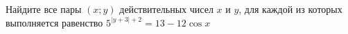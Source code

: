 \begin{ex}
	\begin{condition}
		Найдите все пары \( (x;y) \) действительных чисел \( x \) и \( y \), для каждой из которых выполняется равенство \( 5^{|y+3|+2}=13-12\cos x \)
	\end{condition}
\end{ex}